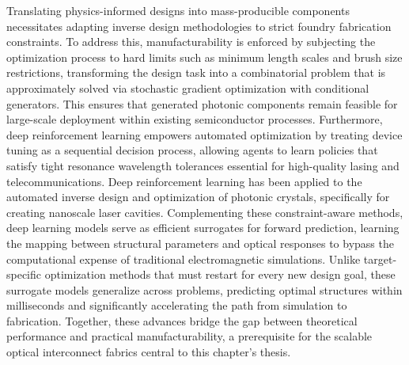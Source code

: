 \documentclass[11pt]{article}
\begin{document}
Translating physics-informed designs into mass-producible components necessitates adapting inverse design methodologies to strict foundry fabrication constraints. To address this, manufacturability is enforced by subjecting the optimization process to hard limits such as minimum length scales and brush size restrictions, transforming the design task into a combinatorial problem that is approximately solved via stochastic gradient optimization with conditional generators. This ensures that generated photonic components remain feasible for large-scale deployment within existing semiconductor processes. Furthermore, deep reinforcement learning empowers automated optimization by treating device tuning as a sequential decision process, allowing agents to learn policies that satisfy tight resonance wavelength tolerances essential for high-quality lasing and telecommunications. Deep reinforcement learning has been applied to the automated inverse design and optimization of photonic crystals, specifically for creating nanoscale laser cavities. \citep{doi_10_1515_nanoph_2022_0692_4b166807} Complementing these constraint-aware methods, deep learning models serve as efficient surrogates for forward prediction, learning the mapping between structural parameters and optical responses to bypass the computational expense of traditional electromagnetic simulations. Unlike target-specific optimization methods that must restart for every new design goal, these surrogate models generalize across problems, predicting optimal structures within milliseconds and significantly accelerating the path from simulation to fabrication. Together, these advances bridge the gap between theoretical performance and practical manufacturability, a prerequisite for the scalable optical interconnect fabrics central to this chapter's thesis. \citep{doi_10_1021_acsphotonics_2c00313_0d7d39c3} \citep{doi_10_1515_nanoph_2022_0692_4b166807} \citep{doi_10_29026_oes_2022_210012_27973a69} \citep{doi_10_1109_jphot_2022_3182050_3cfb78ba}
\end{document}
